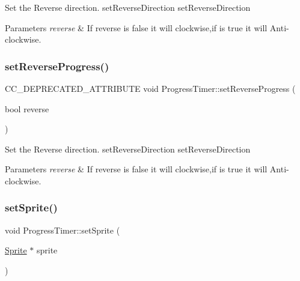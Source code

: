 Set the Reverse direction.  set\+Reverse\+Direction  set\+Reverse\+Direction 
\begin{DoxyParams}{Parameters}
{\em reverse} & If reverse is false it will clockwise,if is true it will Anti-\/clockwise. \\
\hline
\end{DoxyParams}
\mbox{\label{classProgressTimer_ac97bd260d1f006c29c20a5d741a7e11b}} 
\subsubsection{\texorpdfstring{set\+Reverse\+Progress()}{setReverseProgress()}\hspace{0.1cm}{\footnotesize\ttfamily [2/2]}}
{\footnotesize\ttfamily C\+C\+\_\+\+D\+E\+P\+R\+E\+C\+A\+T\+E\+D\+\_\+\+A\+T\+T\+R\+I\+B\+U\+TE void Progress\+Timer\+::set\+Reverse\+Progress (\begin{DoxyParamCaption}\item[{bool}]{reverse }\end{DoxyParamCaption})\hspace{0.3cm}{\ttfamily [inline]}}

Set the Reverse direction.  set\+Reverse\+Direction  set\+Reverse\+Direction 
\begin{DoxyParams}{Parameters}
{\em reverse} & If reverse is false it will clockwise,if is true it will Anti-\/clockwise. \\
\hline
\end{DoxyParams}
\mbox{\label{classProgressTimer_a3910e7c59c07732edcc2039dacbe7172}} 
\subsubsection{\texorpdfstring{set\+Sprite()}{setSprite()}\hspace{0.1cm}{\footnotesize\ttfamily [1/2]}}
{\footnotesize\ttfamily void Progress\+Timer\+::set\+Sprite (\begin{DoxyParamCaption}\item[{\hyperlink{classSprite}{Sprite} $\ast$}]{sprite }\end{DoxyParamCaption})}


